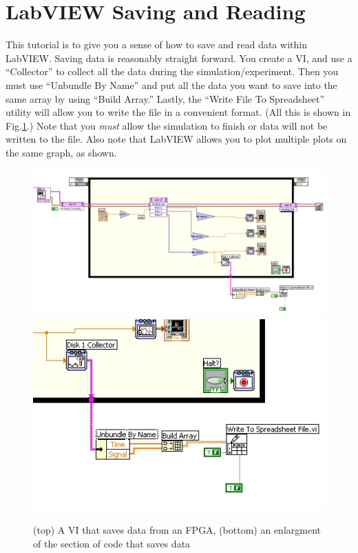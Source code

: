 \section{LabVIEW Saving and Reading \label{sec-saveread}}  

This tutorial is to give you a sense of how to save and read data within
LabVIEW.  Saving data is reasonably straight forward.  You create a VI, and use
a ``Collector'' to collect all the data during the simulation/experiment.  Then
you must use ``Unbundle By Name'' and put all the data you want to save into the
same array by using ``Build Array.''  Lastly, the ``Write File To Spreadsheet''
utility will allow you to write the file in a convenient format.  (All this is
shown in Fig.\ref{fig-savedata}.)  Note that you \emph{must} allow the
simulation to finish or data will not be written to the file.  Also note
that LabVIEW allows you to plot multiple plots on the same graph, as shown.

\begin{figure}[h!]
\centering
\includegraphics[width=6in]{saveread/write1}
\includegraphics[width=5in]{saveread/write2}
\caption{(top) A VI  that saves data from an FPGA, (bottom) an enlargment of the section of
  code that saves data}
\label{fig-savedata}
\end{figure}


